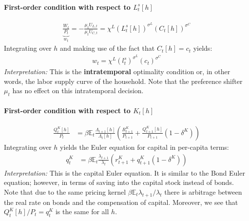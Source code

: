 \begin{enumerate}
\paragraph{First-order condition with respect to \(L^{s}_{t}[h]\)}
\begin{align*}
\underbrace{\frac{W_{t}}{P_{t}}}_{w_{t}} = - \frac{\mu_{t} U_{L,t}}{\mu_{t} U_{C,t}} = \chi^{L} {(L^{s}_{t}[h])}^{\sigma^{L}} {(C_{t}[h])}^{\sigma^{C}}
\end{align*}
Integrating over \(h\) and making use of the fact that \(C_{t}[h] = c_{t}\) yields:
\begin{align*}
w_{t} = \chi^{L} {(l^{s}_{t})}^{\sigma^{L}} {(c_{t})}^{\sigma^{C}}
\end{align*}
\emph{Interpretation:} This is the \textbf{intratemporal} optimality condition or, in other words, the labor supply curve of the household.
Note that the preference shifter \(\mu_t\) has no effect on this intratemporal decision.

\paragraph{First-order condition with respect to \(K_{t}[h]\)}
\begin{align*}
\frac{Q^{K}_{t}[h]}{P_{t}} &= \beta \mathbb{E}_{t} \frac{\Lambda_{t+1}[h]}{\Lambda_{t}[h]} \left( \frac{R^{K}_{t+1}}{P_{t+1}} + \frac{Q^{K}_{t+1}[h]}{P_{t+1}} (1-\delta^{K}) \right)
\end{align*}
Integrating over \(h\) yields the Euler equation for capital in per-capita terms:
\begin{align*}
q^{K}_{t} &= \beta \mathbb{E}_{t} \frac{\lambda_{t+1}}{\lambda_{t}} \left( r^{K}_{t+1} + q^{K}_{t+1}(1-\delta^{K}) \right)
\end{align*}
\emph{Interpretation:} This is the capital Euler equation.
It is similar to the Bond Euler equation; however, in terms of saving into the capital stock instead of bonds.
Note that due to the same pricing kernel \(\beta \mathbb{E}_{t} \lambda_{t+1}/\lambda_t\)
  there is arbitrage between the real rate on bonds and the compensation of capital.
Moreover, we see that \(Q^{K}_{t}[h]/P_{t} = q^{K}_{t}\) is the same for all \(h\).


\end{enumerate}
